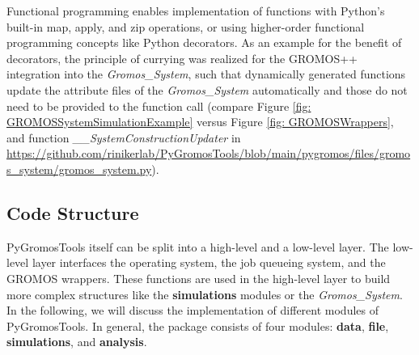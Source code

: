 Functional programming enables implementation of functions with Python's built-in map, apply, and zip operations, or using higher-order functional programming concepts like Python decorators.\cite{Ganney2020} As an example for the benefit of decorators, the principle of currying\cite{Curry1958} was realized for the GROMOS++ integration into the \textit{Gromos\_System}, such that dynamically generated functions update the attribute files of the \textit{Gromos\_System} automatically and those do not need to be provided to the function call (compare Figure \ref{fig: GROMOSSystemSimulationExample} versus Figure \ref{fig: GROMOSWrappers}, and function \textit{\_\_SystemConstructionUpdater} in \url{https://github.com/rinikerlab/PyGromosTools/blob/main/pygromos/files/gromos\_system/gromos\_system.py}).

\subsection{Code Structure}
PyGromosTools itself can be split into a high-level and a low-level layer. 
The low-level layer interfaces the operating system, the job queueing system, and the GROMOS wrappers. These functions are used in the high-level layer to build more complex structures like the \textbf{simulations} modules or the \textit{Gromos\_System}. 
%
In the following, we will discuss the implementation of different modules of PyGromosTools. In general, the package consists of four modules: \textbf{data}, \textbf{file}, \textbf{simulations}, and \textbf{analysis}.  


